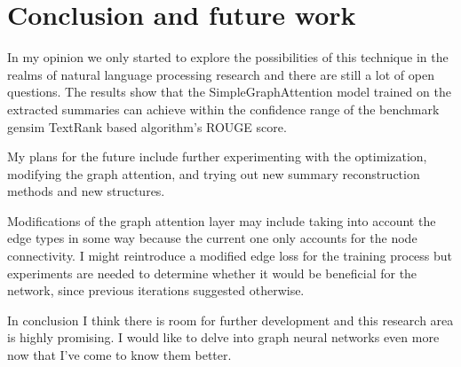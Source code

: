 \chapter{Conclusion and future work}\label{sect:Future}
In my opinion we only started to explore the possibilities of this technique in the realms of natural language processing research and there are still a lot of open questions. The results show that the SimpleGraphAttention model trained on the extracted summaries can achieve within the confidence range of the benchmark gensim TextRank based algorithm's ROUGE score.

My plans for the future include further experimenting with the optimization, modifying the graph attention, and trying out new summary reconstruction methods and new structures.

Modifications of the graph attention layer may include taking into account the edge types in some way because the current one only accounts for the node connectivity. I might reintroduce a modified edge loss for the training process but experiments are needed to determine whether it would be beneficial for the network, since previous iterations suggested otherwise.

In conclusion I think there is room for further development and this research area is highly promising. I would like to delve into graph neural networks even more now that I've come to know them better.